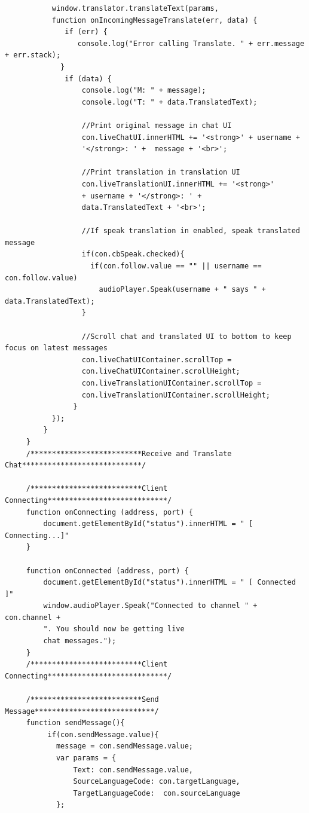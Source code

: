 \documentclass[runningheads]{llncs}
\begin{document}
{\begin{verbatim}
           window.translator.translateText(params, 
           function onIncomingMessageTranslate(err, data) {
              if (err) {
                 console.log("Error calling Translate. " + err.message + err.stack);
             }
              if (data) {
                  console.log("M: " + message);
                  console.log("T: " + data.TranslatedText);

                  //Print original message in chat UI
                  con.liveChatUI.innerHTML += '<strong>' + username + 
                  '</strong>: ' +  message + '<br>';

                  //Print translation in translation UI
                  con.liveTranslationUI.innerHTML += '<strong>' 
                  + username + '</strong>: ' +
                  data.TranslatedText + '<br>';

                  //If speak translation in enabled, speak translated message
                  if(con.cbSpeak.checked){
                    if(con.follow.value == "" || username == con.follow.value)
                      audioPlayer.Speak(username + " says " + data.TranslatedText);
                  }

                  //Scroll chat and translated UI to bottom to keep focus on latest messages
                  con.liveChatUIContainer.scrollTop = 
                  con.liveChatUIContainer.scrollHeight;
                  con.liveTranslationUIContainer.scrollTop = 
                  con.liveTranslationUIContainer.scrollHeight;
                }
           });
         }
     }
     /**************************Receive and Translate Chat****************************/

     /**************************Client Connecting****************************/
     function onConnecting (address, port) {
         document.getElementById("status").innerHTML = " [ Connecting...]"
     }

     function onConnected (address, port) {
         document.getElementById("status").innerHTML = " [ Connected ]"
         window.audioPlayer.Speak("Connected to channel " + con.channel +
         ". You should now be getting live
         chat messages.");
     }
     /**************************Client Connecting****************************/

     /**************************Send Message****************************/
     function sendMessage(){
          if(con.sendMessage.value){
            message = con.sendMessage.value;
            var params = {
                Text: con.sendMessage.value,
                SourceLanguageCode: con.targetLanguage,
                TargetLanguageCode:  con.sourceLanguage
            };


\end{verbatim}}
\end{document}

